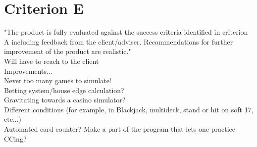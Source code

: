 \documentclass[]{article}
\begin{document}
\section{Criterion E}
"The product is fully evaluated against the success criteria identified in criterion A including feedback from the client/adviser. Recommendations for further improvement of the product are realistic." 
\\ Will have to reach to the client
\\ Improvements...
\\ Never too many games to simulate!
\\ Betting system/house edge calculation?
\\ Gravitating towards a casino simulator?
\\ Different conditions (for example, in Blackjack, multideck, stand or hit on soft 17, etc...)
\\ Automated card counter? Make a part of the program that lets one practice CCing?
\end{document}
